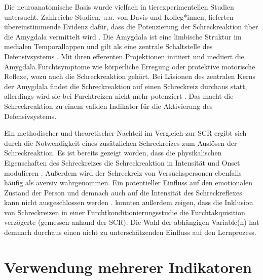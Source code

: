 		Die neuroanatomische Basis wurde vielfach in tierexperimentellen Studien untersucht. Zahlreiche Studien, u.a. von Davis und Kolleg*innen, lieferten übereinstimmende Evidenz dafür, dass die Potenzierung der Schreckreaktion über die Amygdala vermittelt wird \parencite[für eine Übersichtsarbeit siehe][]{DAVIS2006}. Die Amygdala ist eine limbische Struktur im medialen Temporallappen und gilt als eine zentrale Schaltstelle des Defensivsystems \parencite{HAMM2006, DAVIS1992}. Mit ihren efferenten Projektionen initiiert und mediiert die Amygdala Furchtsymptome wie körperliche Erregung oder protektive motorische Reflexe, wozu auch die Schreckreaktion gehört. 
		Bei Läsionen des zentralen Kerns der Amygdala findet die Schreckreaktion auf einen Schreckreiz durchaus statt, allerdings wird sie bei Furchtreizen nicht mehr potenziert \parencite{HITCHCOCK1987, HITCHCOCK1986}. Das macht die Schreckreaktion zu einem validen Indikator für die Aktivierung des Defensivsystems.
		
		Ein methodischer und theoretischer Nachteil im Vergleich zur SCR ergibt sich durch die Notwendigkeit eines zusätzlichen Schreckreizes zum Auslösen der Schreckreaktion. Es ist bereits gezeigt worden, dass die physikalischen Eigenschaften des Schreckreizes die Schreckreaktion in Intensität und Onset modulieren \parencite{BLUMENTHAL2005}. Außerdem wird der Schreckreiz von Versuchspersonen ebenfalls häufig als aversiv wahrgenommen. Ein potentieller Einfluss auf den emotionalen Zustand der Person und demnach auch auf die Intensität des Schreckreflexes kann nicht ausgeschlossen werden \parencite{LIPP2006}. \textcite{SJOUWERMAN2016} konnten außerdem zeigen, dass die Inklusion von Schreckreizen in einer Furchtkonditionierungsstudie die Furchtakquisition verzögerte (gemessen anhand der SCR). Die Wahl der abhängigen Variable(n) hat demnach durchaus einen nicht zu unterschätzenden Einfluss auf den Lernprozess.
		
		
			
\section{Verwendung mehrerer Indikatoren}			\label{outcome}

